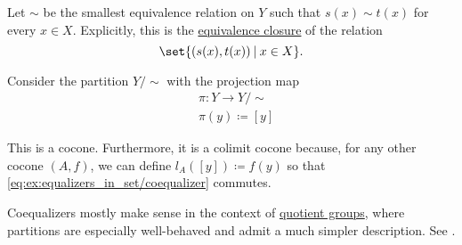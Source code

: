 \begin{example}
\begin{thmenum}
    Let \( {\sim} \) be the smallest equivalence relation on \( Y \) such that \( s(x) \sim t(x) \) for every \( x \in X \). Explicitly, this is the \hyperref[thm:equivalence_closure]{equivalence closure} of the relation
    \begin{equation*}
      \set{ (s(x), t(x)) \given x \in X }.
    \end{equation*}

    Consider the partition \( Y / {\sim} \) with the projection map
    \begin{equation*}
      \begin{aligned}
        &\pi: Y \to Y / {\sim} \\
        &\pi(y) \coloneqq [y]
      \end{aligned}
    \end{equation*}

    This is a cocone. Furthermore, it is a colimit cocone because, for any other cocone \( (A, f) \), we can define \( l_A([y]) \coloneqq f(y) \) so that \eqref{eq:ex:equalizers_in_set/coequalizer} commutes.

    Coequalizers mostly make sense in the context of \hyperref[def:group/quotient]{quotient groups}, where partitions are especially well-behaved and admit a much simpler description. See .
  \end{thmenum}
\end{example}
